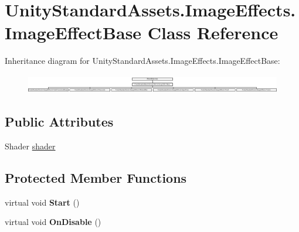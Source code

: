 \hypertarget{class_unity_standard_assets_1_1_image_effects_1_1_image_effect_base}{}\section{Unity\+Standard\+Assets.\+Image\+Effects.\+Image\+Effect\+Base Class Reference}
\label{class_unity_standard_assets_1_1_image_effects_1_1_image_effect_base}
Inheritance diagram for Unity\+Standard\+Assets.\+Image\+Effects.\+Image\+Effect\+Base\+:\begin{figure}[H]
\begin{center}
\leavevmode
\includegraphics[height=0.828402cm]{class_unity_standard_assets_1_1_image_effects_1_1_image_effect_base}
\end{center}
\end{figure}
\subsection*{Public Attributes}
\begin{DoxyCompactItemize}
\item 
Shader \hyperlink{class_unity_standard_assets_1_1_image_effects_1_1_image_effect_base_a8e9767f9fb7f9d66c187173cedfb5ccf}{shader}
\end{DoxyCompactItemize}
\subsection*{Protected Member Functions}
\begin{DoxyCompactItemize}
\item 
virtual void {\bfseries Start} ()\hypertarget{class_unity_standard_assets_1_1_image_effects_1_1_image_effect_base_ae47320704d1e3516b307acffa5bd6116}{}\label{class_unity_standard_assets_1_1_image_effects_1_1_image_effect_base_ae47320704d1e3516b307acffa5bd6116}

\item 
virtual void {\bfseries On\+Disable} ()\hypertarget{class_unity_standard_assets_1_1_image_effects_1_1_image_effect_base_ae5e5daec47be729ff285431020e313fc}{}\label{class_unity_standard_assets_1_1_image_effects_1_1_image_effect_base_ae5e5daec47be729ff285431020e313fc}

\end{DoxyCompactItemize}
